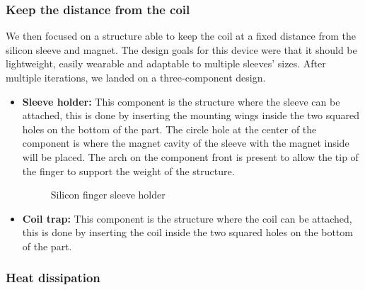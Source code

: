 \subsubsection{Keep the distance from the coil}
We then focused on a structure able to keep the coil at a fixed distance from the silicon sleeve and magnet.
The design goals for this device were that it should be lightweight, easily wearable and adaptable to multiple sleeves' sizes.
After multiple iterations, we landed on a three-component design.
\begin{itemize}
    \item \textbf{Sleeve holder: } This component is the structure where the sleeve can be attached, this is done by inserting the mounting wings inside the two squared holes on the bottom of the part.
    The circle hole at the center of the component is where the magnet cavity of the sleeve with the magnet inside will be placed.
    The arch on the component front is present to allow the tip of the finger to support the weight of the structure.
    \begin{figure}
        \centering
        \caption{Silicon finger sleeve holder}
        \label{fig: sleeve_holder}
    \end{figure}

    \item \textbf{Coil trap: } This component is the structure where the coil can be attached, this is done by inserting the coil inside the two squared holes on the bottom of the part.
\end{itemize}




\subsubsection{Heat dissipation}

